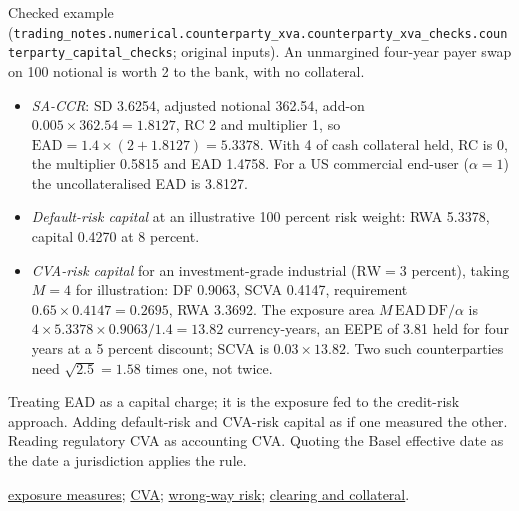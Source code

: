 \begin{qfrule}
 Checked example (\nolinkurl{trading_notes.numerical.counterparty_xva.counterparty_xva_checks.counterparty_capital_checks}; original inputs). An unmargined four-year payer swap on 100 notional is worth 2 to the bank, with no collateral.
\begin{itemize}
\item \emph{SA-CCR}: SD 3.6254, adjusted notional 362.54, add-on $0.005\times362.54=1.8127$, RC 2 and multiplier 1, so $\mathrm{EAD}=1.4\times(2+1.8127)=5.3378$. With 4 of cash collateral held, RC is 0, the multiplier 0.5815 and EAD 1.4758. For a US commercial end-user ($\alpha=1$) the uncollateralised EAD is 3.8127.
\item \emph{Default-risk capital} at an illustrative 100 percent risk weight: RWA 5.3378, capital 0.4270 at 8 percent.
\item \emph{CVA-risk capital} for an investment-grade industrial ($\mathrm{RW}=3$ percent), taking $M=4$ for illustration: DF 0.9063, SCVA 0.4147, requirement $0.65\times0.4147=0.2695$, RWA 3.3692. The exposure area $M\,\mathrm{EAD}\,\mathrm{DF}/\alpha$ is $4\times5.3378\times0.9063/1.4=13.82$ currency-years, an EEPE of 3.81 held for four years at a 5 percent discount; SCVA is $0.03\times13.82$. Two such counterparties need $\sqrt{2.5}=1.58$ times one, not twice.
\end{itemize}

 Treating EAD as a capital charge; it is the exposure fed to the credit-risk approach. Adding default-risk and CVA-risk capital as if one measured the other. Reading regulatory CVA as accounting CVA. Quoting the Basel effective date as the date a jurisdiction applies the rule.

 \hyperref[def:counterparty-exposure-measures]{exposure measures}; \hyperref[meth:credit-valuation-adjustment]{CVA}; \hyperref[def:wrong-way-risk]{wrong-way risk}; \hyperref[mech:otc-clearing-collateral]{clearing and collateral}.

\end{qfrule}
